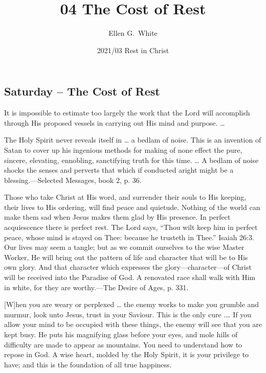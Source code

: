 \documentclass[a4paper, 10pt, twoside, headings=small]{scrartcl}
\title{04 The Cost of Rest}
\author{Ellen G.\ White}
\date{2021/03 Rest in Christ}
\begin{document}
\maketitle

\thispagestyle{empty}

\pagestyle{fancy}

\begin{multicols}{2}

\section*{Saturday – The Cost of Rest}

It is impossible to estimate too largely the work that the Lord will accomplish through His proposed vessels in carrying out His mind and purpose. …

The Holy Spirit never reveals itself in … a bedlam of noise. This is an invention of Satan to cover up his ingenious methods for making of none effect the pure, sincere, elevating, ennobling, sanctifying truth for this time. … A bedlam of noise shocks the senses and perverts that which if conducted aright might be a blessing.—Selected Messages, book 2, p. 36.

Those who take Christ at His word, and surrender their souls to His keeping, their lives to His ordering, will find peace and quietude. Nothing of the world can make them sad when Jesus makes them glad by His presence. In perfect acquiescence there is perfect rest. The Lord says, “Thou wilt keep him in perfect peace, whose mind is stayed on Thee: because he trusteth in Thee.” Isaiah 26:3. Our lives may seem a tangle; but as we commit ourselves to the wise Master Worker, He will bring out the pattern of life and character that will be to His own glory. And that character which expresses the glory—character—of Christ will be received into the Paradise of God. A renovated race shall walk with Him in white, for they are worthy.—The Desire of Ages, p. 331.

[W]hen you are weary or perplexed … the enemy works to make you grumble and murmur, look unto Jesus, trust in your Saviour. This is the only cure .… If you allow your mind to be occupied with these things, the enemy will see that you are kept busy. He puts his magnifying glass before your eyes, and mole hills of difficulty are made to appear as mountains. You need to understand how to repose in God. A wise heart, molded by the Holy Spirit, it is your privilege to have; and this is the foundation of all true happiness.


\end{multicols}
\end{document}
